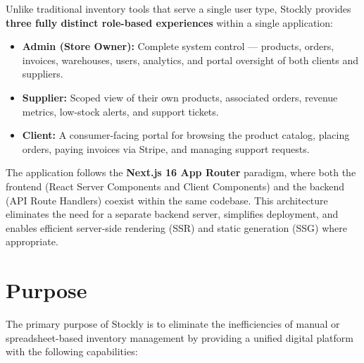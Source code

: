 ﻿\documentclass[12pt,a4paper]{report}
\begin{document}
\begin{tcolorbox}[infobox,title={Three-Role Architecture}]
Unlike traditional inventory tools that serve a single user type, Stockly provides \textbf{three fully distinct role-based experiences} within a single application:
\begin{itemize}[leftmargin=1.5em]
  \item \textbf{Admin (Store Owner):} Complete system control --- products, orders, invoices, warehouses, users, analytics, and portal oversight of both clients and suppliers.
  \item \textbf{Supplier:} Scoped view of their own products, associated orders, revenue metrics, low-stock alerts, and support tickets.
  \item \textbf{Client:} A consumer-facing portal for browsing the product catalog, placing orders, paying invoices via Stripe, and managing support requests.
\end{itemize}
\end{tcolorbox}

The application follows the \textbf{Next.js 16 App Router} paradigm, where both the frontend (React Server Components and Client Components) and the backend (API Route Handlers) coexist within the same codebase. This architecture eliminates the need for a separate backend server, simplifies deployment, and enables efficient server-side rendering (SSR) and static generation (SSG) where appropriate.

\section{Purpose}

The primary purpose of Stockly is to eliminate the inefficiencies of manual or spreadsheet-based inventory management by providing a unified digital platform with the following capabilities:
\end{document}
